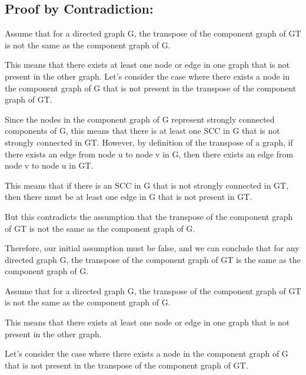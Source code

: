 \documentclass{article}
\begin{document}
\subsection*{\huge Proof by Contradiction:}

\large Assume that for a directed graph G, the transpose of the component graph of GT is not the same as the component graph of G.\newline


This means that there exists at least one node or edge in one graph that is not present in the other graph.
Let's consider the case where there exists a node in the component graph of G that is not present in the transpose of the component graph of GT.\newline


Since the nodes in the component graph of G represent strongly connected components of G, this means that there is at least one SCC in G that is not strongly connected in GT.
However, by definition of the transpose of a graph, if there exists an edge from node u to node v in G, then there exists an edge from node v to node u in GT.\newline


This means that if there is an SCC in G that is not strongly connected in GT, then there must be at least one edge in G that is not present in GT.\newline


But this contradicts the assumption that the transpose of the component graph of GT is not the same as the component graph of G.\newline


Therefore, our initial assumption must be false, and we can conclude that for any directed graph G, the transpose of the component graph of GT is the same as the component graph of G.\newline


Assume that for a directed graph G, the transpose of the component graph of GT is not the same as the component graph of G.\newline


This means that there exists at least one node or edge in one graph that is not present in the other graph.\newline


Let's consider the case where there exists a node in the component graph of G that is not present in the transpose of the component graph of GT.\newline
\end{document}
